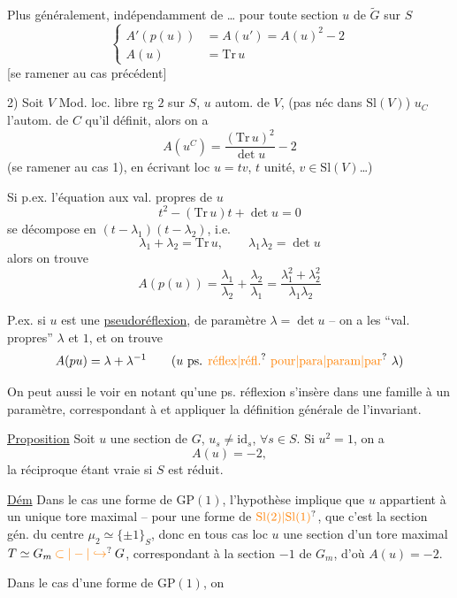 Plus généralement, indépendamment de   \ldots{} pour  toute section $u$ de $\widetilde G$ sur $S$
\[
\left\{\begin{aligned}
A'(p(u))&=A(u')=A(u)^2-2\\
A(u)&=\mathrm{Tr}\,u
\end{aligned}\right.
\]
[se ramener au cas précédent]

2) Soit $V$ Mod. loc. libre rg $2$ sur $S$,  $u$ autom. de $V$, \unsure{:|;|,}  (pas néc dans $\mathrm{Sl}(V)$) $u_C$ l'autom. de $C$ qu'il définit, alors on a
\[
A(u^C)=\frac{(\mathrm{Tr}\,u)^2}{\det u}-2
\]
(se ramener au cas 1), en écrivant loc $u=tv$, $t$ unité, $v\in\mathrm{Sl}(V)$\ldots)

Si p.ex. l'équation aux val. propres de $u$
\[
t^2-(\mathrm{Tr}\,u)t+\det u=0
\]
se décompose en $(t-\lambda_1)(t-\lambda_2)$, i.e.
\[
\lambda_1+\lambda_2=\mathrm{Tr}\,u,\qquad\lambda_1\lambda_2=\det u
\]
alors on trouve
\[
A(p(u))=\frac{\lambda_1}{\lambda_2}+\frac{\lambda_2}{\lambda_1}=\frac{\lambda_1^2+\lambda_2^2}{\lambda_1\lambda_2}
\]

P.ex. si $u$ est une \uline{pseudoréflexion},  de paramètre $\lambda=\det u$ -- on a les ``val. propres'' $\lambda$ et $1$, et on trouve
\[
A(pu)=\lambda+\lambda^{-1}\qquad(u\text{ ps. }\unsure{\text{réflex}|\text{réfl.}}\ \unsure{\text{pour}|\text{para}|\text{param}|\text{par}}\ \lambda)
\]

On peut aussi le voir en notant qu'une ps. réflexion s'insère dans une famille à un paramètre, correspondant à
et appliquer la définition générale de l'invariant.

\uline{Proposition} Soit $u$ une section de $G$,   $u_s\ne\mathrm{id}_s$, $\forall s\in S$.  Si $u^2=1$,  on a
\[
A(u)=-2,
\]
la réciproque étant vraie si $S$ est réduit.

\uline{Dém} Dans le cas   une forme de $\mathrm{GP}(1)$, l'hypothèse  implique que $u$ appartient à un unique tore maximal -- pour une forme de  $\unsure{\mathrm{Sl}(2)|\mathrm{Sl}(1)}$, que c'est la section gén. du centre $\mu_2\simeq\{\pm1\}_S$, donc en tous cas loc $u$   une section d'un tore maximal $T\simeq G_m\mathbin{\unsure{\subset|-|\hookrightarrow}}G$, correspondant à la section $-1$ de $G_m$, d'où $A(u)=-2$.

Dans le cas d'une forme de $\mathrm{GP}(1)$, on 
